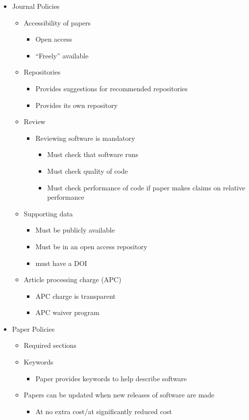 \documentclass[11pt, oneside]{amsart}
\begin{document}
\begin{itemize}
\item Journal Policies
\begin{itemize}
	\item Accessibility of papers
	\begin{itemize}
		\item Open access
		\item ``Freely'' available
	\end{itemize}
	\item Repositories
	\begin{itemize}
		\item Provides suggestions for recommended repositories
		\item Provides its own repository
	\end{itemize}
	\item Review
	\begin{itemize}
		\item Reviewing software is mandatory
		\begin{itemize}
			\item Must check that software runs
			\item Must check quality of code
			\item Must check performance of code if paper makes claims on relative performance
		\end{itemize}
	\end{itemize}	
	\item Supporting data
	\begin{itemize}
		\item Must be publicly available
		\item Must be in an open access repository
		\item must have a DOI
	\end{itemize}
	\item Article processing charge (APC)
	\begin{itemize}
		\item APC charge is transparent
		\item APC waiver program
	\end{itemize}
\end{itemize}

\item Paper Policies
\begin{itemize}
	\item Required sections
	\item Keywords
	\begin{itemize}
		\item Paper provides keywords to help describe software
	\end{itemize}
	\item Papers can be updated when new releases of software are made
	\begin{itemize}
		\item At no extra cost/at significantly reduced cost
	\end{itemize}
\end{itemize}


\end{itemize}
\end{document}
